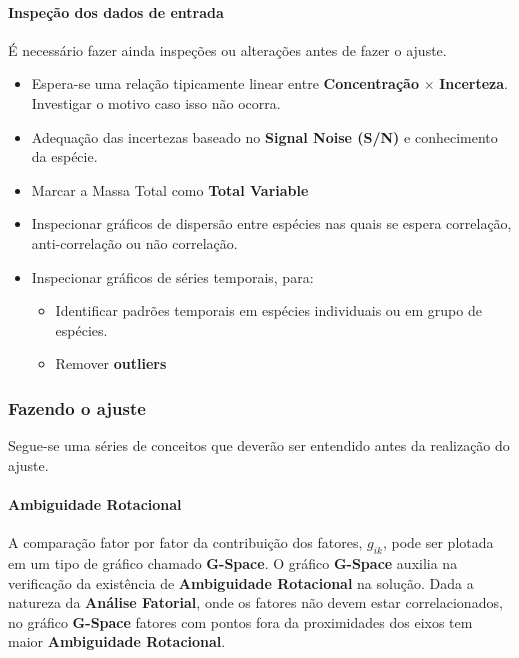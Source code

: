 \paragraph{Inspeção dos dados de entrada}

É necessário fazer ainda inspeções ou alterações antes de fazer o ajuste.
\begin{itemize}
  \item Espera-se uma relação tipicamente linear entre 
        \textbf{Concentração} $\times$ \textbf{Incerteza}.  
        Investigar o motivo caso isso não ocorra. 
  \item Adequação das incertezas baseado no \textbf{Signal Noise (S/N)} e 
        conhecimento da espécie. 
  \item Marcar a Massa Total como \textbf{Total Variable}
  \item Inspecionar gráficos de dispersão entre espécies nas quais se espera 
        correlação, anti-correlação ou não correlação. 
  \item Inspecionar gráficos de séries temporais, para:
    \begin{itemize}
      \item Identificar padrões temporais em espécies individuais ou em grupo 
            de espécies.
      \item Remover \textbf{outliers} 
    \end{itemize}
\end{itemize}

\subsubsection{Fazendo o ajuste}

Segue-se uma séries de conceitos que deverão ser entendido antes da realização 
do ajuste. 

\paragraph{Ambiguidade Rotacional}

A comparação fator por fator da contribuição dos fatores, $g_{ik}$, 
pode ser plotada em um tipo de gráfico chamado \textbf{G-Space}. 
O gráfico \textbf{G-Space} auxilia na verificação da existência de 
\textbf{Ambiguidade Rotacional} na solução. 
Dada a natureza da \textbf{Análise Fatorial}, onde os fatores não devem estar 
correlacionados, no gráfico \textbf{G-Space} fatores com pontos fora da 
proximidades dos eixos tem maior \textbf{Ambiguidade Rotacional}. 

